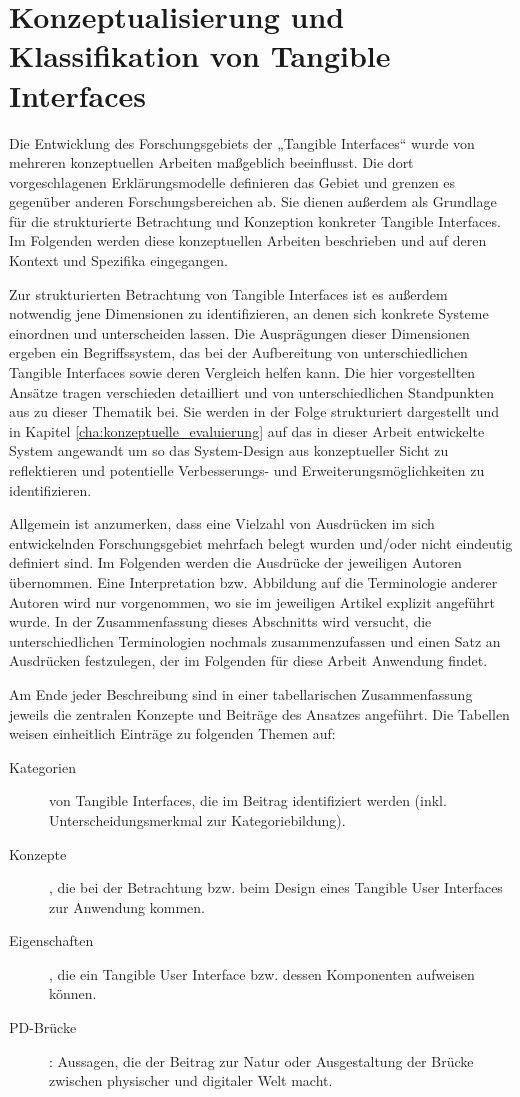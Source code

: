 \section{Konzeptualisierung und Klassifikation von Tangible Interfaces} %
\label{sec:konzeptualisierungen_von_tangible_interfaces}

Die Entwicklung des Forschungsgebiets der „Tangible Interfaces“ wurde von mehreren konzeptuellen Arbeiten maßgeblich beeinflusst. Die dort vorgeschlagenen Erklärungsmodelle definieren das Gebiet und grenzen es gegenüber anderen Forschungsbereichen ab. Sie dienen außerdem als Grundlage für die strukturierte Betrachtung und Konzeption konkreter Tangible Interfaces. Im Folgenden werden diese konzeptuellen Arbeiten beschrieben und auf deren Kontext und Spezifika eingegangen.

Zur strukturierten Betrachtung von Tangible Interfaces ist es außerdem notwendig jene Dimensionen zu identifizieren, an denen sich konkrete Systeme einordnen und unterscheiden lassen. Die Ausprägungen dieser Dimensionen ergeben ein Begriffssystem, das bei der Aufbereitung von unterschiedlichen Tangible Interfaces sowie deren Vergleich helfen kann. Die hier vorgestellten Ansätze tragen verschieden detailliert und von unterschiedlichen Standpunkten aus zu dieser Thematik bei. Sie werden in der Folge strukturiert dargestellt und in Kapitel \ref{cha:konzeptuelle_evaluierung} auf das in dieser Arbeit entwickelte System angewandt um so das System-Design aus konzeptueller Sicht zu reflektieren und potentielle Verbesserungs- und Erweiterungsmöglichkeiten zu identifizieren.

Allgemein ist anzumerken, dass eine Vielzahl von Ausdrücken im sich entwickelnden Forschungsgebiet mehrfach belegt wurden und/oder nicht eindeutig definiert sind. Im Folgenden werden die Ausdrücke der jeweiligen Autoren übernommen. Eine Interpretation bzw. Abbildung auf die Terminologie anderer Autoren wird nur vorgenommen, wo sie im jeweiligen Artikel explizit angeführt wurde. In der Zusammenfassung dieses Abschnitts wird versucht, die unterschiedlichen Terminologien nochmals zusammenzufassen und einen Satz an Ausdrücken festzulegen, der im Folgenden für diese Arbeit Anwendung findet.

Am Ende jeder Beschreibung sind in einer tabellarischen Zusammenfassung jeweils die zentralen Konzepte und Beiträge des Ansatzes angeführt. Die Tabellen weisen einheitlich Einträge zu folgenden Themen auf:
\begin{description}
 \item[Kategorien] von Tangible Interfaces, die im Beitrag identifiziert werden  (inkl. Unterscheidungsmerkmal zur Kategoriebildung).
 \item[Konzepte], die bei der Betrachtung bzw. beim Design eines Tangible User Interfaces zur Anwendung kommen.
 \item[Eigenschaften], die ein Tangible User Interface bzw. dessen Komponenten aufweisen können.
 \item[PD-Brücke]: Aussagen, die der Beitrag zur Natur oder Ausgestaltung der Brücke zwischen physischer und digitaler Welt macht.
\end{description}


